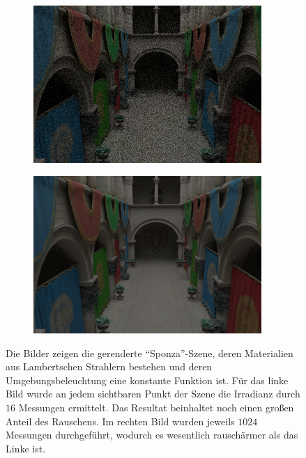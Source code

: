 		\begin{figure}[h]
			\begin{subfigure}[b]{0.5\textwidth}
				\center
				\includegraphics[width=0.95\textwidth]{pic/sponza-noise-high.png}
			\end{subfigure}
			\begin{subfigure}[b]{0.5\textwidth}
				\center
				\includegraphics[width=0.95\textwidth]{pic/sponza-noise-low.png}
			\end{subfigure}
			\caption[Rauschen des Path Tracing anhand der \enquote{Sponza}-Szene]{Die Bilder zeigen die gerenderte \enquote{Sponza}-Szene, deren Materialien aus Lambertschen Strahlern bestehen und deren Umgebungsbeleuchtung eine konstante Funktion ist. Für das linke Bild wurde an jedem sichtbaren Punkt der Szene die Irradianz durch $16$ Messungen ermittelt. Das Resultat beinhaltet noch einen großen Anteil des Rauschens. Im rechten Bild wurden jeweils $1024$ Messungen durchgeführt, wodurch es wesentlich rauschärmer als das Linke ist.}
			\label{fig:sponza-noise}
		\end{figure}

